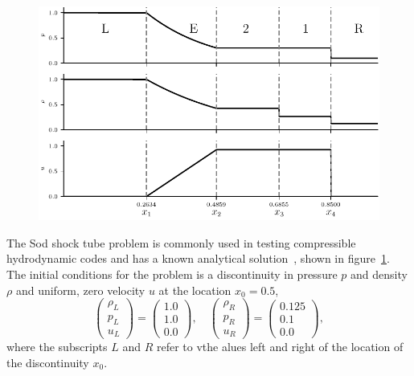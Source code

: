 \begin{figure}[t]
  \centering
  \includegraphics[width=\linewidth]{sod_analytical_solution.pdf}
  \label{fig:sod_analytical_solution}
\end{figure}

The Sod shock tube problem is commonly used in testing compressible hydrodynamic codes and has a known analytical solution~\cite{sodSurveySeveralFinite1978}, shown in figure~\ref{fig:sod_analytical_solution}. The initial conditions for the problem is a discontinuity in pressure $p$ and density $\rho$ and uniform, zero velocity $u$ at the location $x_0=0.5$,
\begin{equation}
  \label{eq:sod_problem_ic}
\begin{pmatrix}\rho _{L}\\p_{L}\\u_{L}\end{pmatrix}
=
\begin{pmatrix}1.0\\1.0\\0.0\end{pmatrix}, \quad
\begin{pmatrix}\rho _{R}\\p_{R}\\u_{R}\end{pmatrix}
=
\begin{pmatrix}0.125\\0.1\\0.0\end{pmatrix},
\end{equation}
where the subscripts $L$ and $R$ refer to vthe alues left and right of the location of the discontinuity $x_0$.

